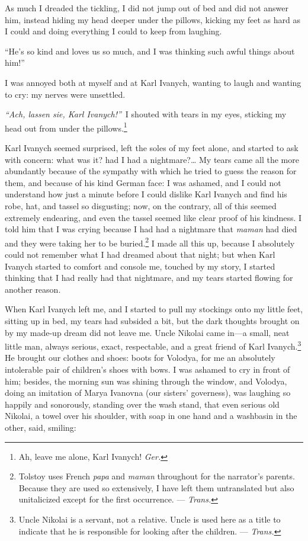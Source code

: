 As much I dreaded the tickling, I did not jump out of bed and did not answer him, instead hiding my head deeper under the pillows, kicking my feet as hard as I could and doing everything I could to keep from laughing.

``He's so kind and loves us so much, and I was thinking such awful things about him!'' %

I was annoyed both at myself and at Karl Ivanych, wanting to laugh and wanting to cry: my nerves were unsettled.

\textit{``Ach, lassen sie, Karl Ivanych!''}~I shouted with tears in my eyes, sticking my head out from under the pillows.\footnote{Ah, leave me alone, Karl Ivanych! \textit{Ger.}} %

Karl Ivanych seemed surprised, left the soles of my feet alone, and started to ask with concern: what was it? had I had a nightmare?\ldots{} My tears came all the more abundantly because of the sympathy with which he tried to guess the reason for them, and because of his kind German face: I was ashamed, and I could not understand how just a minute before I could dislike Karl Ivanych and find his robe, hat, and tassel so disgusting; now, on the contrary, all of this seemed extremely endearing, and even the tassel seemed like clear proof of his kindness. I told him that I was crying because I had had a nightmare that \textit{maman} had died and they were taking her to be buried.\footnote{Tolstoy uses French \textit{papa} and \textit{maman} throughout for the narrator's parents. Because they are used so extensively, I have left them untranslated but also unitalicized except for the first occurrence. --- \textit{Trans.}} I made all this up, because I absolutely could not remember what I had dreamed about that night; but when Karl Ivanych started to comfort and console me, touched by my story, I started thinking that I had really had that nightmare, and my tears started flowing for another reason. 

When Karl Ivanych left me, and I started to pull my stockings onto my little feet, sitting up in bed, my tears had subsided a bit, but the dark thoughts brought on by my made-up dream did not leave me. Uncle Nikolai came in---a small, neat little man, always serious, exact, respectable, and a great friend of Karl Ivanych.\footnote{Uncle Nikolai is a servant, not a relative. Uncle is used here as a title to indicate that he is responsible for looking after the children. --- \textit{Trans.}} He brought our clothes and shoes: boots for Volodya, for me an absolutely intolerable pair of children's shoes with bows. I was ashamed to cry in front of him; besides, the morning sun was shining through the window, and Volodya, doing an imitation of Marya Ivanovna (our sisters' governess), was laughing so happily and sonorously, standing over the wash stand, that even serious old Nikolai, a towel over his shoulder, with soap in one hand and a washbasin in the other, said, smiling:

